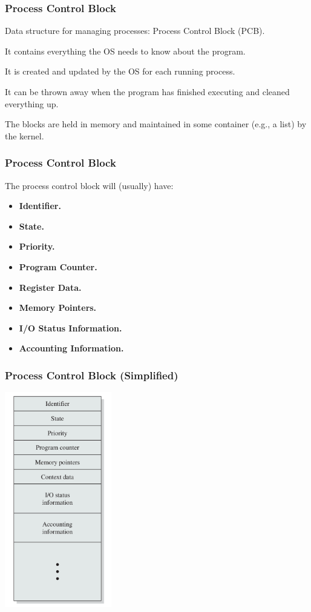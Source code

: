 \begin{frame}
\frametitle{Process Control Block}

Data structure for managing processes: \alert{Process Control Block} (PCB). 

It contains everything the OS needs to know about the program. 

It is created and updated by the OS for each running process.

It can be thrown away when the program has finished executing and cleaned everything up. 

The blocks are held in memory and maintained in some container (e.g., a list) by the kernel.


\end{frame}

\begin{frame}
\frametitle{Process Control Block}

The process control block will (usually) have:
\begin{itemize}
	\item \textbf{Identifier.} 
	\item \textbf{State.} 
	\item \textbf{Priority.} 
	\item \textbf{Program Counter.}
	\item \textbf{Register Data.} 
	\item \textbf{Memory Pointers.}
	\item \textbf{I/O Status Information.} 
	\item \textbf{Accounting Information.} 
\end{itemize}

\end{frame}

\begin{frame}
\frametitle{Process Control Block (Simplified)}

\begin{center}
\includegraphics[width=0.35\textwidth]{images/pcb.png}
\end{center}

\end{frame}

